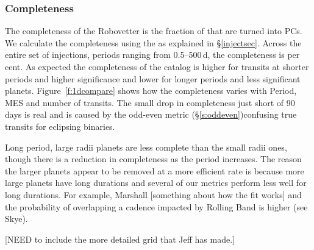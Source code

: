 
\subsubsection{Completeness}
The completeness of the Robovetter is the fraction of  that are turned into PCs.  We calculate the completeness using the  as explained in \S\ref{injectsec}.  
Across the entire set of injections, periods ranging from 0.5--500\,d, the completeness is \completeness{} per cent. As expected the completeness of the catalog is higher for transits at shorter periods and higher significance and lower for longer periods and less significant planets. Figure~\ref{f:1dcompare} shows how the completeness varies with Period, MES and number of transits. The small drop in completeness just short of 90\,days is real and is caused by the odd-even metric (\S\ref{s:oddeven})confusing true transits for eclipsing binaries.  

Long period, large radii planets are less complete than the small radii ones, though there is a reduction in completeness as the period increases.  The reason the larger planets appear to be removed at a more efficient rate is because more large planets have long durations and several of our metrics perform less well for long durations. For example, Marshall [something about how the fit works] and the probability of overlapping a cadence impacted by Rolling Band is higher (see Skye). 

[NEED to include the more detailed grid that Jeff has made.]



